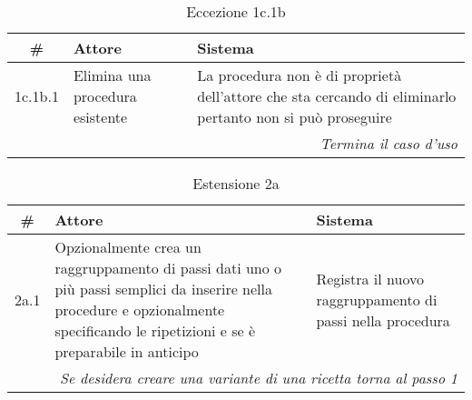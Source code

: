 \begin{table}[H]\centering\color{red}\caption*{Eccezione 1c.1b}
      \small
      \begin{tabular}{|c|p{7cm}|p{5.8cm}|}
            \hline\bfseries \# & \bfseries Attore                & \bfseries Sistema                                                                                         \\\hline
            1c.1b.1            & Elimina una procedura esistente & La procedura non è di proprietà dell’attore che sta cercando di eliminarlo pertanto non si può proseguire \\\hline
            \multicolumn{3}{|r|}{\textit{Termina il caso d'uso}}                                                                                                             \\\hline
      \end{tabular}
\end{table}

\begin{table}[H]\centering\caption*{Estensione 2a}
      \small
      \begin{tabular}{|c|p{7cm}|p{6.24cm}|}
            \hline\bfseries \# & \bfseries Attore                                                                                                                                                                   & \bfseries Sistema                                         \\\hline
            2a.1               & Opzionalmente crea un raggruppamento di passi dati uno o più passi semplici da inserire nella procedure e opzionalmente specificando le ripetizioni e se è preparabile in anticipo & Registra il nuovo raggruppamento di passi nella procedura \\\hline
            \multicolumn{3}{|r|}{\textit{Se desidera creare una variante di una ricetta torna al passo 1}}                                                                                                                                                                      \\\hline
      \end{tabular}
\end{table}

